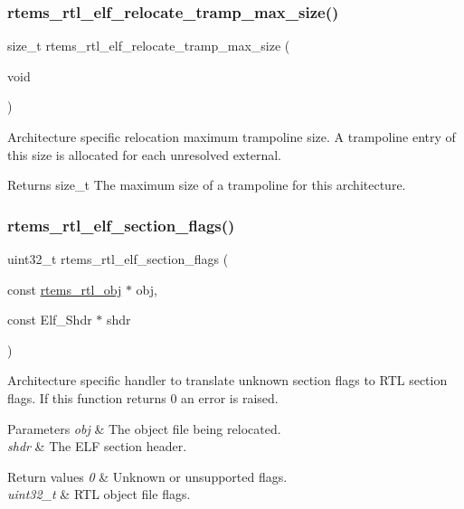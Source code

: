 \subsubsection{\texorpdfstring{rtems\_rtl\_elf\_relocate\_tramp\_max\_size()}{rtems\_rtl\_elf\_relocate\_tramp\_max\_size()}}
{\footnotesize\ttfamily size\+\_\+t rtems\+\_\+rtl\+\_\+elf\+\_\+relocate\+\_\+tramp\+\_\+max\+\_\+size (\begin{DoxyParamCaption}\item[{void}]{ }\end{DoxyParamCaption})}

Architecture specific relocation maximum trampoline size. A trampoline entry of this size is allocated for each unresolved external.

\begin{DoxyReturn}{Returns}
size\+\_\+t The maximum size of a trampoline for this architecture. 
\end{DoxyReturn}
\mbox{\label{rtl-elf_8h_a3938c960beee26f9c02da2b3306331be}} 
\subsubsection{\texorpdfstring{rtems\_rtl\_elf\_section\_flags()}{rtems\_rtl\_elf\_section\_flags()}}
{\footnotesize\ttfamily uint32\+\_\+t rtems\+\_\+rtl\+\_\+elf\+\_\+section\+\_\+flags (\begin{DoxyParamCaption}\item[{const \mbox{\hyperlink{structrtems__rtl__obj}{rtems\+\_\+rtl\+\_\+obj}} $\ast$}]{obj,  }\item[{const Elf\+\_\+\+Shdr $\ast$}]{shdr }\end{DoxyParamCaption})}

Architecture specific handler to translate unknown section flags to R\+TL section flags. If this function returns 0 an error is raised.


\begin{DoxyParams}{Parameters}
{\em obj} & The object file being relocated. \\
\hline
{\em shdr} & The E\+LF section header. \\
\hline
\end{DoxyParams}

\begin{DoxyRetVals}{Return values}
{\em 0} & Unknown or unsupported flags. \\
\hline
{\em uint32\+\_\+t} & R\+TL object file flags. \\
\hline
\end{DoxyRetVals}
